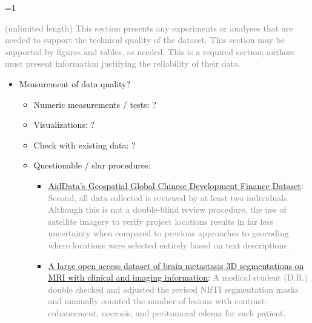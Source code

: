 \documentclass[fleqn,10pt]{wlscirep}
\newcommand{\ifinstruction}{1} %
\begin{document}
\ifnum \ifinstruction=1

\textcolor{gray}{(unlimited length) This section presents any experiments or analyses that are needed to support the technical quality of the dataset. This section may be supported by figures and tables, as needed. This is a required section; authors must present information justifying the reliability of their data.}

\begin{itemize}
  \item
  Measurement of data quality?
  
  \begin{itemize}
    \item
    Numeric measurements / tests: ?
    
    \item
    Visualizations: ?
    
    \item
    Check with existing data: ?
    
    \item
    Questionable / slur procedures:
      
      \begin{itemize}
      \item
      \href{https://www.nature.com/articles/s41597-024-03341-w?_gl=1*5ya8g2*_up*MQ..&gclid=EAIaIQobChMInOXO84DVhgMViewWBR3vWQJAEAAYASAAEgJICfD_BwE#Sec28}{AidData’s Geospatial Global Chinese Development Finance Dataset}: \textcolor{gray}{Second, all data collected is reviewed by at least two individuals. Although this is not a double-blind review procedure, the use of satellite imagery to verify project locations results in far less uncertainty when compared to previous approaches to geocoding where locations were selected entirely based on text descriptions.}
      
      \item
      \href{https://www.nature.com/articles/s41597-024-03021-9?_gl=1*1u1zppx*_up*MQ..&gclid=EAIaIQobChMInOXO84DVhgMViewWBR3vWQJAEAAYASAAEgJICfD_BwE#Sec9}{A large open access dataset of brain metastasis 3D segmentations on MRI with clinical and imaging information}: \textcolor{gray}{A medical student (D.R.) double checked and adjusted the revised NIfTI segmentation masks and manually counted the number of lesions with contrast-enhancement, necrosis, and peritumoral edema for each patient.}
      

\end{itemize}
\end{itemize}
\end{itemize}
\end{document}
